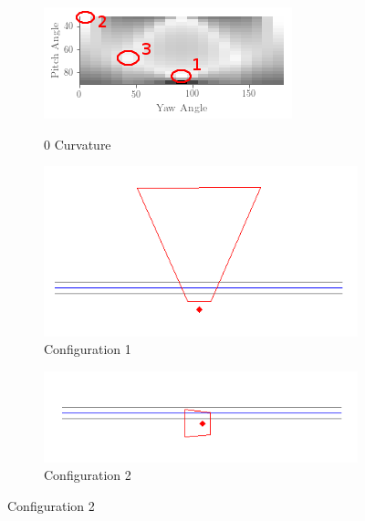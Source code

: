 \documentclass[a4paper,12pt,twoside,openright]{report}
\begin{document}
\begin{figure}[h!]
    \begin{subfigure}[b]{0.45\textwidth}
    \centering
    \includegraphics[width=\textwidth]{figures/simple_objective/pitch_yaw_0_curvature_annotated.png}
    \label{fig:simpleobjective:0curvature}
    \caption{0 Curvature}
\end{subfigure}
\begin{subfigure}[b]{0.45\textwidth}
    \centering
    \includegraphics[width=\textwidth]{figures/simple_objective/0_curvature_bestpos_small.png}
    \caption{Configuration 1}
\end{subfigure}
\begin{subfigure}[b]{0.45\textwidth}
    \centering
    \includegraphics[width=\textwidth]{figures/simple_objective/0_curvature_pos2_small.png}
    \caption{Configuration 2}
\end{subfigure}

\end{figure}
\end{document}
